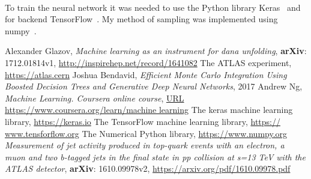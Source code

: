 \documentclass[a4paper,11pt,twoside]{article}
\begin{document}
\ \\To train the neural network it was needed to use the Python library Keras~\cite{keras} and for backend TensorFlow~\cite{tensorflow}. My method of sampling was implemented using numpy~\cite{numpy}.






\begin{thebibliography}{11}

 Alexander Glazov, \textit{Machine learning as an instrument for dana unfolding}, \textbf{arXiv}: 1712.01814v1, \url{http://inspirehep.net/record/1641082}
 The ATLAS experiment, \url{https://atlas.cern}
 Joshua Bendavid, \textit{Efficient Monte Carlo Integration Using Boosted Decision Trees and Generative Deep Neural Networks}, 2017
 Andrew Ng, \textit{Machine Learning. Coursera online course}, \url{URL https://www.coursera.org/learn/machine learning}
 The keras machine learning library, \url{https://keras.io}
 The TensorFlow machine learning library, \url{https:// www.tensforflow.org}
 The Numerical Python library, \url{https://www.numpy.org}
 \textit{Measurement of jet activity produced in top-quark events with an electron, a muon and two b-tagged jets in the final state in pp collision at s=13 TeV with the ATLAS detector}, \textbf{arXiv}: 1610.09978v2, \url{https://arxiv.org/pdf/1610.09978.pdf} 
\end{thebibliography}
\end{document}
